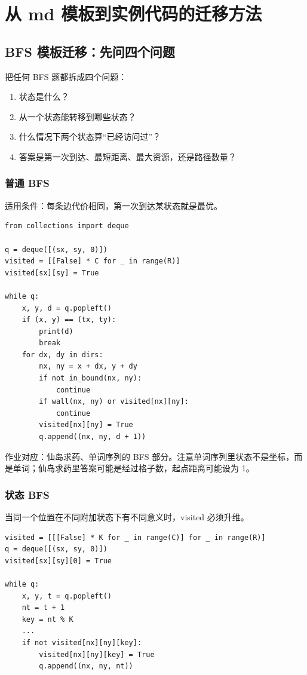 \documentclass[10pt,a4paper,fontset=none]{ctexart}
\begin{document}
\section{从 md 模板到实例代码的迁移方法}

\subsection{BFS 模板迁移：先问四个问题}
\begin{methodbox}
把任何 BFS 题都拆成四个问题：
\begin{enumerate}
  \item 状态是什么？
  \item 从一个状态能转移到哪些状态？
  \item 什么情况下两个状态算“已经访问过”？
  \item 答案是第一次到达、最短距离、最大资源，还是路径数量？
\end{enumerate}
\end{methodbox}

\subsubsection{普通 BFS}
适用条件：每条边代价相同，第一次到达某状态就是最优。
\begin{lstlisting}[style=py]
from collections import deque

q = deque([(sx, sy, 0)])
visited = [[False] * C for _ in range(R)]
visited[sx][sy] = True

while q:
    x, y, d = q.popleft()
    if (x, y) == (tx, ty):
        print(d)
        break
    for dx, dy in dirs:
        nx, ny = x + dx, y + dy
        if not in_bound(nx, ny):
            continue
        if wall(nx, ny) or visited[nx][ny]:
            continue
        visited[nx][ny] = True
        q.append((nx, ny, d + 1))
\end{lstlisting}

作业对应：仙岛求药、单词序列的 BFS 部分。注意单词序列里状态不是坐标，而是单词；仙岛求药里答案可能是经过格子数，起点距离可能设为 1。

\subsubsection{状态 BFS}
当同一个位置在不同附加状态下有不同意义时，visited 必须升维。
\begin{lstlisting}[style=py]
visited = [[[False] * K for _ in range(C)] for _ in range(R)]
q = deque([(sx, sy, 0)])
visited[sx][sy][0] = True

while q:
    x, y, t = q.popleft()
    nt = t + 1
    key = nt % K
    ...
    if not visited[nx][ny][key]:
        visited[nx][ny][key] = True
        q.append((nx, ny, nt))
\end{lstlisting}
\end{document}
